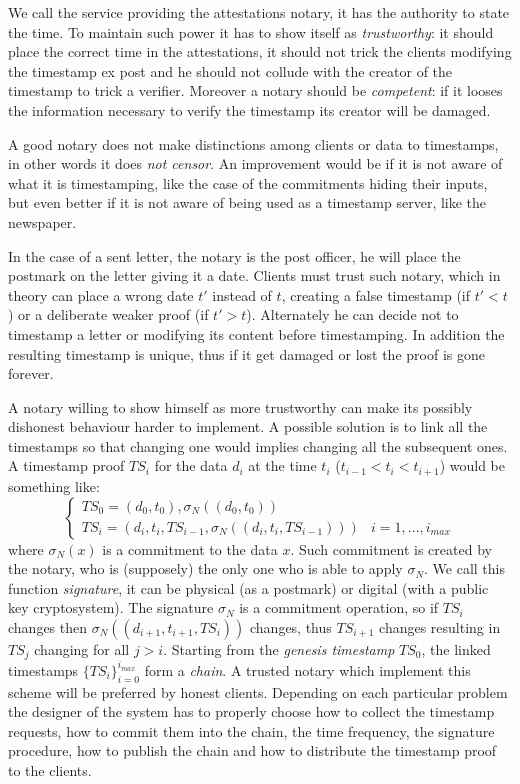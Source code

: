 We call the service providing the attestations notary, it has the authority to state the time. To maintain such power it has to show itself as \textit{trustworthy}: it should place the correct time in the attestations, it should not trick the clients modifying the timestamp ex post and he should not collude with the creator of the timestamp to trick a verifier. Moreover a notary should be \textit{competent}: if it looses the information necessary to verify the timestamp its creator will be damaged.

A good notary does not make distinctions among clients or data to timestamps, in other words it does \textit{not censor}. An improvement would be if it is not aware of what it is timestamping, like the case of the commitments hiding their inputs, but even better if it is not aware of being used as a timestamp server, like the newspaper.

In the case of a sent letter, the notary is the post officer, he will place the postmark on the letter giving it a date. 
Clients must trust such notary, which in theory can place a wrong date $t'$ instead of $t$, creating a false timestamp (if $t'<t$) or a deliberate weaker proof (if $t'>t$). Alternately he can decide not to timestamp a letter or modifying its content before timestamping. In addition the resulting timestamp is unique, thus if it get damaged or lost the proof is gone forever.

A notary willing to show himself as more trustworthy can make its possibly dishonest behaviour harder to implement. A possible solution is to link all the timestamps so that changing one would implies changing all the subsequent ones. A timestamp proof $TS_i$ for the data $d_i$ at the time $t_i$ ($t_{i-1}<t_i<t_{i+1}$) would be something like:
\begin{equation}
	\label{singed-chain}
	\begin{cases}
		TS_0 =(d_0,t_0), \sigma_N((d_0,t_0)) & 
		\\
		TS_i =(d_i,t_i,TS_{i-1}, \sigma_N((d_i,t_i,TS_{i-1}))) & i = 1, ..., i_{max}		
	\end{cases}
\end{equation}
where $\sigma_N (x)$ is a commitment to the data $x$. Such commitment is created by the notary, who is (supposely) the only one who is able to apply $\sigma_N$. We call this function \textit{signature}, it can be physical (as a postmark) or digital (with a public key cryptosystem). The signature $\sigma_N$ is a commitment operation, so if $TS_{i}$ changes then $\sigma_N((d_{i+1},t_{i+1},TS_i))$ changes, thus $TS_{i+1}$ changes resulting in $TS_j$ changing for all $j>i$. Starting from the \textit{genesis timestamp} $TS_0$, the linked timestamps $\{ TS_{i} \}_{i=0}^{i_{max}}$ form a \textit{chain}. A trusted notary which implement this scheme will be preferred by honest clients. Depending on each particular problem the designer of the system has to properly choose how to collect the timestamp requests, how to commit them into the chain, the time frequency, the signature procedure, how to publish the chain and how to distribute the timestamp proof to the clients.

